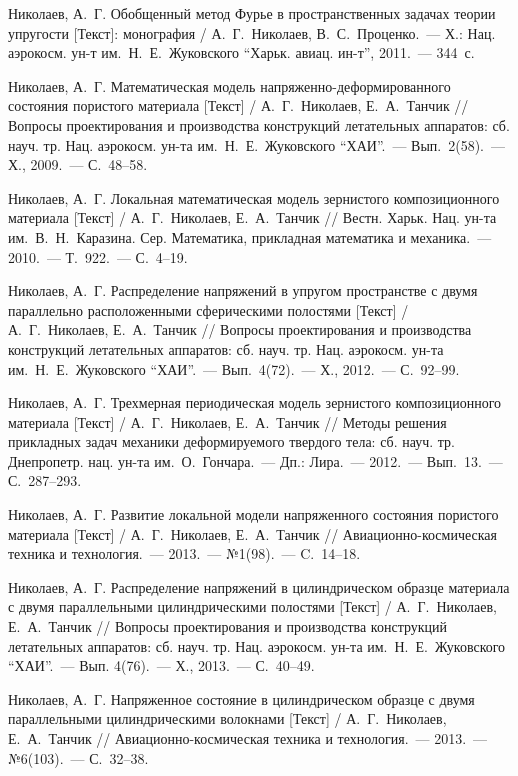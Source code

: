 \begin{biblist}{99}
Николаев, А.~Г. 
Обобщенный метод Фурье в пространственных задачах теории упругости [Текст]: монография 
/ А.~Г.~Николаев, В.~С.~Проценко.~--- Х.: Нац. аэрокосм. ун-т им.~Н.~Е.~Жуковского ``Харьк. авиац. ин-т'', 2011.~--- 344~с. 

Николаев, А.~Г. 
Математическая модель напряженно-деформированного состояния пористого материала [Текст] 
/ А.~Г.~Николаев, Е.~А.~Танчик 
// Вопросы проектирования и производства конструкций летательных аппаратов: сб. науч. тр. Нац. аэрокосм. ун-та им.~Н.~Е.~Жуковского ``ХАИ''.~--- Вып.~2(58).~--- Х., 2009.~--- С.~48--58.

Николаев, А.~Г. 
Локальная математическая модель зернистого композиционного материала [Текст] 
/ А.~Г.~Николаев, Е.~А.~Танчик 
// Вестн. Харьк. Нац. ун-та им.~В.~Н.~Каразина. Сер. Математика, прикладная математика и механика.~--- 2010.~--- Т.~922.~--- С.~4--19.

Николаев, А.~Г. 
Распределение напряжений в упругом пространстве с двумя параллельно расположенными сферическими полостями [Текст] 
/ А.~Г.~Николаев, Е.~А.~Танчик 
// Вопросы проектирования и производства конструкций летательных аппаратов: сб. науч. тр. Нац. аэрокосм. ун-та им.~Н.~Е.~Жуковского ``ХАИ''.~--- Вып.~4(72).~--- Х., 2012.~--- С.~92--99.

Николаев, А.~Г. 
Трехмерная периодическая модель зернистого композиционного материала [Текст] 
/ А.~Г.~Николаев, Е.~А.~Танчик 
// Методы решения прикладных задач механики деформируемого твердого тела: сб. науч. тр. Днепропетр. нац. ун-та им.~О.~Гончара.~--- Дп.: Лира.~--- 2012.~--- Вып.~13.~--- С.~287--293.

Николаев, А.~Г. 
Развитие локальной модели напряженного состояния пористого материала [Текст] 
/ А.~Г.~Николаев, Е.~А.~Танчик 
// Авиационно-космическая техника и технология.~--- 2013.~--- №1(98).~--- C.~14--18.

Николаев, А.~Г. 
Распределение напряжений в цилиндрическом образце материала с двумя параллельными цилиндрическими полостями [Текст] 
/ А.~Г.~Николаев, Е.~А.~Танчик 
// Вопросы проектирования и производства конструкций летательных аппаратов: сб. науч. тр. Нац. аэрокосм. ун-та им.~Н.~Е.~Жуковского ``ХАИ''.~--- Вып. 4(76).~--- Х., 2013.~--- С.~40--49.

Николаев, А.~Г. 
Напряженное состояние в цилиндрическом образце с двумя параллельными цилиндрическими волокнами [Текст] 
/ А.~Г.~Николаев, Е.~А.~Танчик 
// Авиационно-космическая техника и технология.~--- 2013.~--- №6(103).~--- С.~32--38.


\end{biblist}
